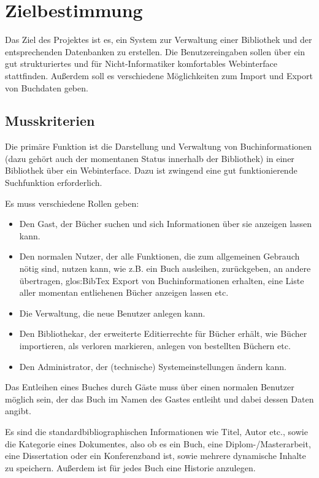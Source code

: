 
\chapter{Zielbestimmung}
Das Ziel des Projektes ist es, ein System zur Verwaltung einer Bibliothek und der entsprechenden Datenbanken zu erstellen. Die Benutzereingaben sollen über ein gut strukturiertes und für Nicht-Informatiker komfortables Webinterface stattfinden. Außerdem soll es verschiedene Möglichkeiten zum Import und Export von Buchdaten geben. 

\section{Musskriterien}
Die primäre Funktion ist die Darstellung und Verwaltung von Buchinformationen (dazu gehört auch der momentanen Status innerhalb der Bibliothek) in einer Bibliothek über ein Webinterface. Dazu ist zwingend eine gut funktionierende Suchfunktion erforderlich.

Es muss verschiedene Rollen geben:
\begin{itemize}
  \item Den Gast, der Bücher suchen und sich Informationen über sie anzeigen lassen kann.
  \item Den normalen Nutzer, der alle Funktionen, die zum allgemeinen Gebrauch nötig sind, nutzen kann, wie z.B. ein Buch ausleihen, zurückgeben, an andere übertragen, \gls{glos:BibTex} Export von Buchinformationen erhalten, eine Liste aller momentan entliehenen Bücher anzeigen lassen etc.
  \item Die Verwaltung, die neue Benutzer anlegen kann.
  \item Den Bibliothekar, der erweiterte Editierrechte für Bücher erhält, wie Bücher importieren, als verloren markieren, anlegen von bestellten Büchern etc.
\item Den Administrator, der (technische) Systemeinstellungen ändern kann.
\end{itemize}

Das Entleihen eines Buches durch Gäste muss über einen normalen Benutzer möglich sein, der das Buch im Namen des Gastes entleiht und dabei dessen Daten angibt. 

Es sind die standardbibliographischen Informationen wie Titel, Autor etc., sowie die Kategorie eines Dokumentes, also ob es ein Buch, eine Diplom-/Masterarbeit, eine Dissertation oder ein Konferenzband ist, sowie mehrere dynamische Inhalte zu speichern. Außerdem ist für jedes Buch eine Historie anzulegen. 

